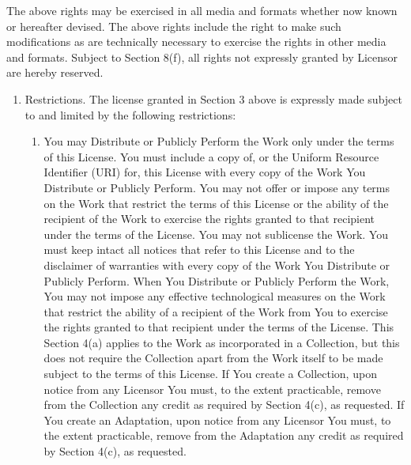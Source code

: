 \documentclass[letterpaper,10pt,english]{manual}
\begin{document}
The above rights may be exercised in all media and formats whether now known or hereafter devised. The above rights include the right to make such modifications as are technically necessary to exercise the rights in other media and formats. Subject to Section 8(f), all rights not expressly granted by Licensor are hereby reserved.
\begin{enumerate}
\item {} 
Restrictions. The license granted in Section 3 above is expressly made subject to and limited by the following restrictions:
\begin{enumerate}
\item {} 
You may Distribute or Publicly Perform the Work only under the terms of this License. You must include a copy of, or the Uniform Resource Identifier (URI) for, this License with every copy of the Work You Distribute or Publicly Perform. You may not offer or impose any terms on the Work that restrict the terms of this License or the ability of the recipient of the Work to exercise the rights granted to that recipient under the terms of the License. You may not sublicense the Work. You must keep intact all notices that refer to this License and to the disclaimer of warranties with every copy of the Work You Distribute or Publicly Perform. When You Distribute or Publicly Perform the Work, You may not impose any effective technological measures on the Work that restrict the ability of a recipient of the Work from You to exercise the rights granted to that recipient under the terms of the License. This Section 4(a) applies to the Work as incorporated in a Collection, but this does not require the Collection apart from the Work itself to be made subject to the terms of this License. If You create a Collection, upon notice from any Licensor You must, to the extent practicable, remove from the Collection any credit as required by Section 4(c), as requested. If You create an Adaptation, upon notice from any Licensor You must, to the extent practicable, remove from the Adaptation any credit as required by Section 4(c), as requested.


\end{enumerate}
\end{enumerate}
\end{document}
